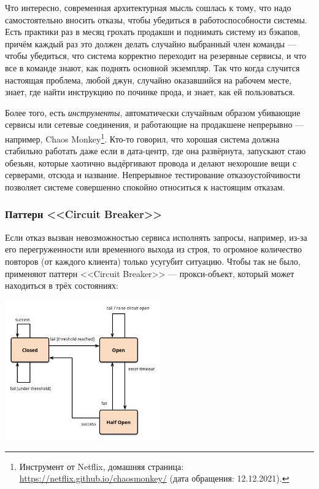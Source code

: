 \documentclass{../../text-style}
\begin{document}
Что интересно, современная архитектурная мысль сошлась к тому, что надо самостоятельно вносить отказы, чтобы убедиться в работоспособности системы. Есть практики раз в месяц грохать продакшн и поднимать систему из бэкапов, причём каждый раз это должен делать случайно выбранный член команды --- чтобы убедиться, что система корректно переходит на резервные сервисы, и что все в команде знают, как поднять основной экземпляр. Так что когда случится настоящая проблема, любой джун, случайно оказавшийся на рабочем месте, знает, где найти инструкцию по починке прода, и знает, как ей пользоваться.

Более того, есть \emph{инструменты}, автоматически случайным образом убивающие сервисы или сетевые соединения, и работающие на продакшене непрерывно --- например, Chaos Monkey\footnote{Инструмент от Netflix, домашняя страница: \url{https://netflix.github.io/chaosmonkey/} (дата обращения: 12.12.2021).}. Кто-то говорил, что хорошая система должна стабильно работать даже если в дата-центр, где она развёрнута, запускают стаю обезьян, которые хаотично выдёргивают провода и делают нехорошие вещи с серверами, отсюда и название. Непрерывное тестирование отказоустойчивости позволяет системе совершенно спокойно относиться к настоящим отказам.

\subsubsection{Паттерн <<Circuit Breaker>>}

Если отказ вызван невозможностью сервиса исполнять запросы, например, из-за его перегруженности или временного выхода из строя, то огромное количество повторов (от каждого клиента) только усугубит ситуацию. Чтобы так не было, применяют паттерн <<Circuit Breaker>> --- прокси-объект, который может находиться в трёх состояниях:

\begin{center}
    \includegraphics[width=0.5\textwidth]{circuitBreakerStates.png}
\end{center}
\end{document}
